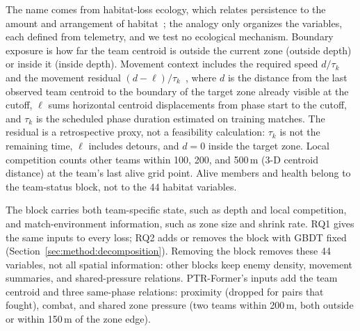 \documentclass[sigconf,anonymous]{acmart}
\begin{document}
The name comes from habitat-loss ecology, which relates persistence to the amount and arrangement of habitat~\cite{Fahrig03}; the analogy only organizes the variables, each defined from telemetry, and we test no ecological mechanism. Boundary exposure is how far the team centroid is outside the current zone (outside depth) or inside it (inside depth). Movement context includes the required speed $d/\tau_k$ and the movement residual $(d-\ell)/\tau_k$~\cite{Nathan08}, where $d$ is the distance from the last observed team centroid to the boundary of the target zone already visible at the cutoff, $\ell$ sums horizontal centroid displacements from phase start to the cutoff, and $\tau_k$ is the scheduled phase duration estimated on training matches. The residual is a retrospective proxy, not a feasibility calculation: $\tau_k$ is not the remaining time, $\ell$ includes detours, and $d=0$ inside the target zone. Local competition counts other teams within 100, 200, and 500\,m (3-D centroid distance) at the team's last alive grid point. Alive members and health belong to the team-status block, not to the 44 habitat variables.

The block carries both team-specific state, such as depth and local competition, and match-environment information, such as zone size and shrink rate. RQ1 gives the same inputs to every loss; RQ2 adds or removes the block with GBDT fixed (Section~\ref{sec:method:decomposition}). Removing the block removes these 44 variables, not all spatial information: other blocks keep enemy density, movement summaries, and shared-pressure relations. PTR-Former's inputs add the team centroid and three same-phase relations: proximity (dropped for pairs that fought), combat, and shared zone pressure (two teams within 200\,m, both outside or within 150\,m of the zone edge).
\end{document}
